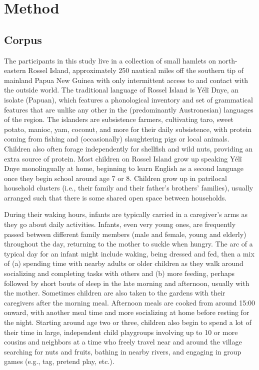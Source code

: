 \documentclass[,man,floatsintext]{apa6}
\begin{document}
\section{Method}\label{methods}

\subsection{Corpus}\label{methods-dataset}

The participants in this study live in a collection of small hamlets on
north-eastern Rossel Island, approximately 250 nautical miles off the
southern tip of mainland Papua New Guinea with only intermittent access
to and contact with the outside world. The traditional language of
Rossel Island is Yélî Dnye, an isolate (Papuan), which features a
phonological inventory and set of grammatical features that are unlike
any other in the (predominantly Austronesian) languages of the region.
The islanders are subsistence farmers, cultivating taro, sweet potato,
manioc, yam, coconut, and more for their daily subsistence, with protein
coming from fishing and (occasionally) slaughtering pigs or local
animals. Children also often forage independently for shellfish and wild
nuts, providing an extra source of protein. Most children on Rossel
Island grow up speaking Yélî Dnye monolingually at home, beginning to
learn English as a second language once they begin school around age 7
or 8. Children grow up in patrilocal household clusters (i.e., their
family and their father's brothers' families), usually arranged such
that there is some shared open space between households.

During their waking hours, infants are typically carried in a
caregiver's arms as they go about daily activities. Infants, even very
young ones, are frequently passed between different family members (male
and female, young and elderly) throughout the day, returning to the
mother to suckle when hungry. The arc of a typical day for an infant
might include waking, being dressed and fed, then a mix of (a) spending
time with nearby adults or older children as they walk around
socializing and completing tasks with others and (b) more feeding,
perhaps followed by short bouts of sleep in the late morning and
afternoon, usually with the mother. Sometimes children are also taken to
the gardens with their caregivers after the morning meal. Afternoon
meals are cooked from around 15:00 onward, with another meal time and
more socializing at home before resting for the night. Starting around
age two or three, children also begin to spend a lot of their time in
large, independent child playgroups involving up to 10 or more cousins
and neighbors at a time who freely travel near and around the village
searching for nuts and fruits, bathing in nearby rivers, and engaging in
group games (e.g., tag, pretend play, etc.).
\end{document}
